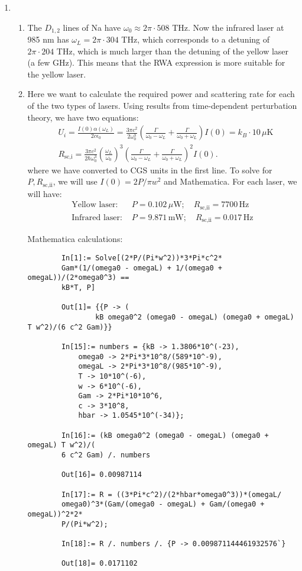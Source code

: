 \documentclass{article}
\theoremstyle{definition}
\newcommand{\al}{\alpha}
\newcommand{\f}[2]{\frac{#1}{#2}}
\newcommand{\lp}{\left(}
\newcommand{\rp}{\right)}
\begin{document}
\begin{enumerate}[label=(\alph*)]
	\item 
	
	\begin{enumerate}[label=(\roman*)]
		\item  The $D_{1,2}$ lines of Na have $\omega_0 \approx 2\pi \cdot 508 $ THz. Now the infrared laser at 985 nm has $\omega_L = 2\pi \cdot 304$ THz, which corresponds to a detuning of $2\pi\cdot 204$ THz, which is much larger than the detuning of the yellow laser (a few GHz). This means that the RWA expression is more suitable for the yellow laser. 
		
		\item Here we want to calculate the required power and scattering rate for each of the two types of lasers. Using results from time-dependent perturbation theory, we have two equations:
		\begin{align*}
			&U_i = \f{I(0) \al(\omega_L)}{2c\epsilon_0} =   \f{3\pi c^2}{2\omega_0^3} \lp \f{\Gamma}{\omega_0 - \omega_L} + \f{\Gamma}{\omega_0 + \omega_L}\rp I(0) = k_B \cdot 10 \, \mu\text{K} \\
			& R_\text{sc,i} = \f{3\pi c^2}{2\hbar \omega_0^3}\lp \f{\omega_L}{\omega_0} \rp^3 \lp \f{\Gamma}{\omega_0 - \omega_L} + \f{\Gamma}{\omega_0 + \omega_L} \rp^2 I(0).
		\end{align*}
	where we have converted to CGS units in the first line. To solve for $P,R_{\text{sc,ii}}$, we will use $I(0)=2P/\pi w^2$ and Mathematica. For each laser, we will have:
	\begin{align*}
		\text{Yellow laser: } \,\,& 
		P = 0.102 \,\mu\text{W}; \quad 
		R_{\text{sc,ii}} = 7700 \,\text{Hz}\\
		\text{Infrared laser:}\,\,&  
		P = 9.871 \, \text{mW}; \quad 
		R_{\text{sc,ii}} = 0.017 \,\text{Hz}
	\end{align*}

	Mathematica calculations:
	\begin{lstlisting}
		In[1]:= Solve[(2*P/(Pi*w^2))*3*Pi*c^2*
		Gam*(1/(omega0 - omegaL) + 1/(omega0 + omegaL))/(2*omega0^3) == 
		kB*T, P]
		
		Out[1]= {{P -> (
				kB omega0^2 (omega0 - omegaL) (omega0 + omegaL) T w^2)/(6 c^2 Gam)}}
		
		In[15]:= numbers = {kB -> 1.3806*10^(-23),
			omega0 -> 2*Pi*3*10^8/(589*10^-9),
			omegaL -> 2*Pi*3*10^8/(985*10^-9),
			T -> 10*10^(-6),
			w -> 6*10^(-6),
			Gam -> 2*Pi*10*10^6,
			c -> 3*10^8,
			hbar -> 1.0545*10^(-34)};
		
		In[16]:= (kB omega0^2 (omega0 - omegaL) (omega0 + omegaL) T w^2)/(
		6 c^2 Gam) /. numbers
		
		Out[16]= 0.00987114
		
		In[17]:= R = ((3*Pi*c^2)/(2*hbar*omega0^3))*(omegaL/
		omega0)^3*(Gam/(omega0 - omegaL) + Gam/(omega0 + omegaL))^2*2*
		P/(Pi*w^2);
		
		In[18]:= R /. numbers /. {P -> 0.009871144461932576`}
		
		Out[18]= 0.0171102
	\end{lstlisting}
	\end{enumerate}
\end{enumerate}
\end{document}
